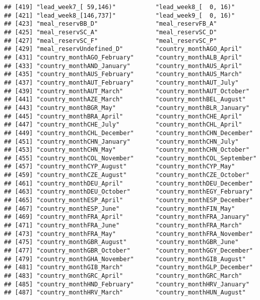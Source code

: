 \documentclass[
]{book}
\begin{document}
\begin{verbatim}
## [419] "lead_week7_[ 59,146)"           "lead_week8_[  0, 16)"          
## [421] "lead_week8_[146,737]"           "lead_week9_[  0, 16)"          
## [423] "meal_reservBB_D"                "meal_reservFB_A"               
## [425] "meal_reservSC_A"                "meal_reservSC_D"               
## [427] "meal_reservSC_F"                "meal_reservSC_P"               
## [429] "meal_reservUndefined_D"         "country_monthAGO_April"        
## [431] "country_monthAGO_February"      "country_monthALB_April"        
## [433] "country_monthAND_January"       "country_monthAUS_April"        
## [435] "country_monthAUS_February"      "country_monthAUS_March"        
## [437] "country_monthAUT_February"      "country_monthAUT_July"         
## [439] "country_monthAUT_March"         "country_monthAUT_October"      
## [441] "country_monthAZE_March"         "country_monthBEL_August"       
## [443] "country_monthBGR_May"           "country_monthBLR_January"      
## [445] "country_monthBRA_April"         "country_monthCHE_April"        
## [447] "country_monthCHE_July"          "country_monthCHL_April"        
## [449] "country_monthCHL_December"      "country_monthCHN_December"     
## [451] "country_monthCHN_January"       "country_monthCHN_July"         
## [453] "country_monthCHN_May"           "country_monthCHN_October"      
## [455] "country_monthCOL_November"      "country_monthCOL_September"    
## [457] "country_monthCYP_August"        "country_monthCYP_May"          
## [459] "country_monthCZE_August"        "country_monthCZE_October"      
## [461] "country_monthDEU_April"         "country_monthDEU_December"     
## [463] "country_monthDEU_October"       "country_monthEGY_February"     
## [465] "country_monthESP_April"         "country_monthESP_December"     
## [467] "country_monthESP_June"          "country_monthFIN_May"          
## [469] "country_monthFRA_April"         "country_monthFRA_January"      
## [471] "country_monthFRA_June"          "country_monthFRA_March"        
## [473] "country_monthFRA_May"           "country_monthFRA_November"     
## [475] "country_monthGBR_August"        "country_monthGBR_June"         
## [477] "country_monthGBR_October"       "country_monthGGY_December"     
## [479] "country_monthGHA_November"      "country_monthGIB_August"       
## [481] "country_monthGIB_March"         "country_monthGLP_December"     
## [483] "country_monthGRC_April"         "country_monthGRC_March"        
## [485] "country_monthHND_February"      "country_monthHRV_January"      
## [487] "country_monthHRV_March"         "country_monthHUN_August"       

\end{verbatim}
\end{document}
